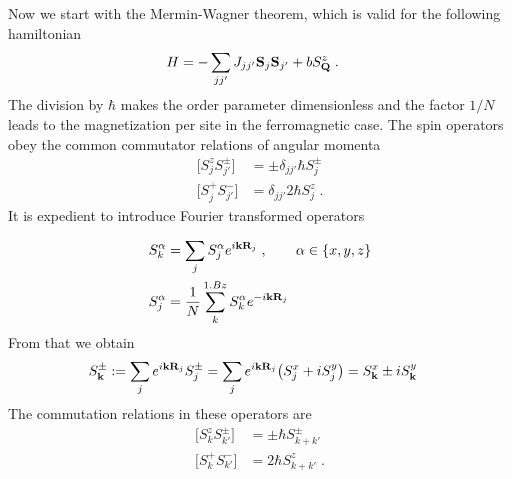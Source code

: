 Now we start with the Mermin-Wagner theorem, which is valid for the 
following  hamiltonian 
\begin{align}\label{eq:}
H &= -\sum_{jj'}J_{jj'} \mathbf S_{j} \mathbf S_{j'} + b    S^{z}_{\mathbf Q}\;.
\end{align}
%
%
The division by $\hbar$ makes the order parameter dimensionless and the factor
$1/N$ leads to the magnetization per site in the ferromagnetic case.
%
The  spin operators obey the common commutator relations of angular momenta
\begin{subequations}\label{eq:}
\begin{align}
\big[ S^{z}_{j} S^{\pm}_{j'}\big] &= \pm \delta_{jj'} \hbar S_{j}^{\pm}\\
\big[ S^{+}_{j} S^{-}_{j'}\big] &= \delta_{jj'} 2 \hbar S_{j}^{z}\;.
\end{align}
\end{subequations}
%
It is expedient to introduce Fourier transformed operators

\begin{subequations}\label{eq:FT:magnetism}
\begin{align}
S_{k}^{\alpha} &= \sum_{j} S_{j}^{\alpha} e^{i \mathbf k \mathbf R_{j}}\;,\qquad \alpha\in\{x,y,z\}\\
S_{j}^{\alpha}&=\frac{1}{N} \sum_{k}^{1.Bz} S_{k}^{\alpha} e^{-i \mathbf k \mathbf R_{j}}
\end{align}
\end{subequations}
%
From that we obtain
%
\begin{align}
S_{\mathbf k}^{\pm} &:= \sum_{j} e^{i\mathbf k \mathbf R_{j}} S_{j}^{\pm}
=\sum_{j} e^{i\mathbf k \mathbf R_{j}}\big(S_{j}^{x}+i S_{j}^{y}\big)
= S_{\mathbf k}^{x} \pm i S_{\mathbf k}^{y}
\end{align}
%
The commutation relations in these operators are
\begin{subequations}\label{eq:}
\begin{align}
\big[ S^{z}_{k} S^{\pm}_{k'}\big] &= \pm \hbar S_{k+k'}^{\pm}\\
\big[ S^{+}_{k} S^{-}_{k'}\big] &= 2 \hbar S_{k+k'}^{z}\;.
\end{align}
\end{subequations}
%

